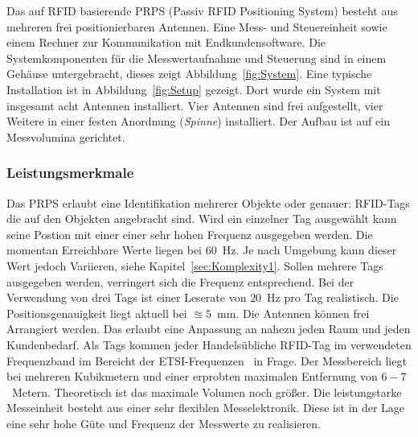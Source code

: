 Das auf RFID basierende PRPS (Passiv RFID Positioning System) besteht aus mehreren frei positionierbaren Antennen. Eine Mess- und Steuereinheit sowie einem Rechner zur Kommunikation mit Endkundensoftware. Die Systemkomponenten für die Messwertaufnahme und Steuerung sind in einem Gehäuse untergebracht, dieses zeigt Abbildung~\ref{fig:System}. Eine typische Installation ist in Abbildung~\ref{fig:Setup} gezeigt. Dort wurde ein System mit insgesamt acht Antennen installiert. Vier Antennen sind frei aufgestellt, vier Weitere in einer festen Anordnung (\textit{Spinne}) installiert. Der Aufbau ist auf ein Messvolumina gerichtet.\\
%
\subsubsection{Leistungsmerkmale}
%
Das PRPS erlaubt eine Identifikation mehrerer Objekte oder genauer: RFID-Tags die auf den Objekten angebracht sind. Wird ein einzelner Tag ausgewählt kann seine Postion mit einer einer sehr hohen Frequenz ausgegeben werden. Die momentan Erreichbare Werte liegen bei $60$~Hz. Je nach Umgebung kann dieser Wert jedoch Variieren, siehe Kapitel~\ref{sec:Komplexity1}. Sollen mehrere Tags ausgegeben werden, verringert sich die Frequenz entsprechend. Bei der Verwendung von drei Tags ist einer Leserate von $20$~Hz pro Tag realistisch. Die Positionsgenauigkeit liegt aktuell bei $\approxeq 5$~mm. Die Antennen können frei Arrangiert werden. Das erlaubt eine Anpassung an nahezu jeden Raum und jeden Kundenbedarf. Als Tags kommen jeder Handelsübliche RFID-Tag im verwendeten Frequenzband im Bereicht der ETSI-Frequenzen~\cite{etsi1} in Frage. Der Messbereich liegt bei mehreren Kubikmetern und einer erprobten maximalen Entfernung von $6-7$~Metern. Theoretisch ist das maximale Volumen noch größer. Die leistungstarke Messeinheit besteht aus einer sehr flexiblen Messelektronik. Diese ist in der Lage eine sehr hohe Güte und Frequenz der Messwerte zu realisieren.\\

